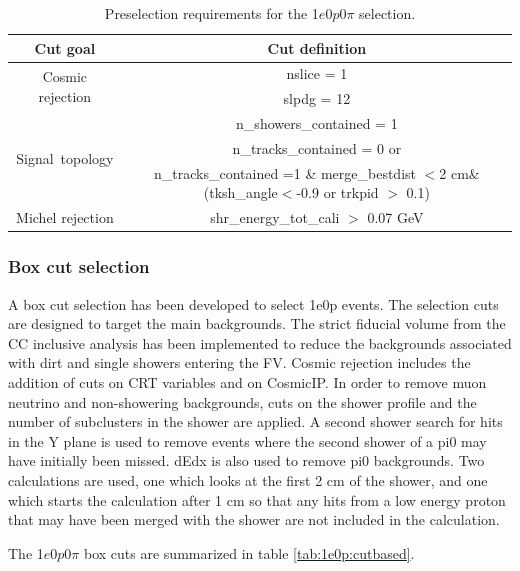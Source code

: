 \documentclass[a4paper]{article}
\newcommand{\zpsel}{1$e$0$p$0$\pi$ }
\begin{document}
\begin{table}[h!]
\centering
\setlength{\tabcolsep}{10pt}
\renewcommand{\arraystretch}{1.25}
 \begin{tabular}{| c | c |} 
 \hline
 Cut goal & Cut definition \\
 \hline\hline
\multirow{2}{*}{Cosmic rejection} & nslice = 1 \\
 & slpdg = 12 \\
 \hline
\multirow{3}{*}{Signal~topology} & n\_showers\_contained = 1 \\
 & n\_tracks\_contained = 0 or \\ &n\_tracks\_contained =1 \& merge\_bestdist $<$2 cm\& (tksh\_angle$<$-0.9 or trkpid $>$ 0.1) \\
 \hline
Michel rejection & shr\_energy\_tot\_cali $>$ 0.07 GeV \\
 \hline
 \end{tabular}
 \caption{\label{tab:1e0p:presel} Preselection requirements for the \zpsel selection.}
\end{table}




\subsubsection{Box cut selection}

A box cut selection has been developed to select 1e0p events.  The selection cuts are designed to target the main backgrounds.  The strict fiducial volume from the CC inclusive analysis \cite{bib:numuCCincl} has been implemented to reduce the backgrounds associated with dirt and single showers %
entering the FV.   Cosmic rejection includes the addition of cuts on CRT variables and on CosmicIP.  In order to remove muon neutrino and non-showering backgrounds, cuts on the shower profile and the number of subclusters in the shower are applied.  A second shower search for hits in the Y plane is used to remove events where the second shower of a pi0 may have initially been missed.  dEdx is also used to remove pi0 backgrounds.  Two calculations are used, one which looks at the first 2 cm of the shower, and one which starts the calculation after 1 cm so that any hits from a low energy proton that may have been merged with the shower are not included in the calculation.

The \zpsel box cuts are summarized in table \ref{tab:1e0p:cutbased}.
\end{document}
